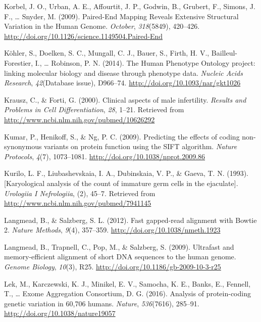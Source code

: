 \documentclass[12pt,twoside]{reedthesis}
\theoremstyle{definition}
\theoremstyle{definition}
\theoremstyle{remark}
\begin{document}
  \hypertarget{ref-Korbel2009}{}
  Korbel, J. O., Urban, A. E., Affourtit, J. P., Godwin, B., Grubert, F.,
  Simons, J. F., \ldots{} Snyder, M. (2009). Paired-End Mapping Reveals
  Extensive Structural Variation in the Human Genome. \emph{October},
  \emph{318}(5849), 420--426.
  \url{http://doi.org/10.1126/science.1149504.Paired-End}
  
  \hypertarget{ref-Kohler2014}{}
  Köhler, S., Doelken, S. C., Mungall, C. J., Bauer, S., Firth, H. V.,
  Bailleul-Forestier, I., \ldots{} Robinson, P. N. (2014). The Human
  Phenotype Ontology project: linking molecular biology and disease
  through phenotype data. \emph{Nucleic Acids Research},
  \emph{42}(Database issue), D966--74.
  \url{http://doi.org/10.1093/nar/gkt1026}
  
  \hypertarget{ref-Krausz2000}{}
  Krausz, C., \& Forti, G. (2000). Clinical aspects of male infertility.
  \emph{Results and Problems in Cell Differentiation}, \emph{28}, 1--21.
  Retrieved from \url{http://www.ncbi.nlm.nih.gov/pubmed/10626292}
  
  \hypertarget{ref-Kumar2009}{}
  Kumar, P., Henikoff, S., \& Ng, P. C. (2009). Predicting the effects of
  coding non-synonymous variants on protein function using the SIFT
  algorithm. \emph{Nature Protocols}, \emph{4}(7), 1073--1081.
  \url{http://doi.org/10.1038/nprot.2009.86}
  
  \hypertarget{ref-Kurilo}{}
  Kurilo, L. F., Liubashevskaia, I. A., Dubinskaia, V. P., \& Gaeva, T. N.
  (1993). {[}Karyological analysis of the count of immature germ cells in
  the ejaculate{]}. \emph{Urologiia I Nefrologiia}, (2), 45--7. Retrieved
  from \url{http://www.ncbi.nlm.nih.gov/pubmed/7941145}
  
  \hypertarget{ref-Langmead2012}{}
  Langmead, B., \& Salzberg, S. L. (2012). Fast gapped-read alignment with
  Bowtie 2. \emph{Nature Methods}, \emph{9}(4), 357--359.
  \url{http://doi.org/10.1038/nmeth.1923}
  
  \hypertarget{ref-Langmead2009}{}
  Langmead, B., Trapnell, C., Pop, M., \& Salzberg, S. (2009). Ultrafast
  and memory-efficient alignment of short DNA sequences to the human
  genome. \emph{Genome Biology}, \emph{10}(3), R25.
  \url{http://doi.org/10.1186/gb-2009-10-3-r25}
  
  \hypertarget{ref-Lek2016}{}
  Lek, M., Karczewski, K. J., Minikel, E. V., Samocha, K. E., Banks, E.,
  Fennell, T., \ldots{} Exome Aggregation Consortium, D. G. (2016).
  Analysis of protein-coding genetic variation in 60,706 humans.
  \emph{Nature}, \emph{536}(7616), 285--91.
  \url{http://doi.org/10.1038/nature19057}
  
\end{document}

